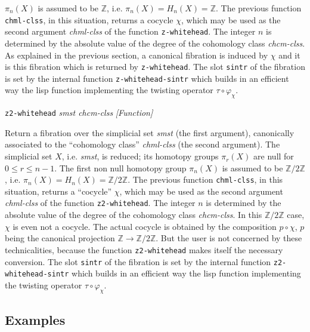 {{$\pi_n(X)$ is assumed to be $\mathbb{Z}$, i.e. $\pi_n(X)= H_n(X)= \mathbb{Z}$. The previous function {\tt chml-clss}, in
this situation, returns a cocycle $\chi$, which may be used as the second argument {\em chml-clss} of the function
{\tt z-whitehead}. The integer  $n$ is determined by the absolute value of the degree of the
cohomology class {\em chcm-clss}. As explained in the previous section, a canonical fibration
is induced by $\chi$ and it is this fibration which is returned by {\tt z-whitehead}. The slot {\tt sintr} of the
fibration is set by the internal function {\tt z-whitehead-sintr} which builds
in an efficient way the lisp function implementing the twisting operator $\tau \circ \varphi_\chi$.
\par}
{\leftskip=5mm
{\tt z2-whitehead} {\em smst chcm-clss}  \hfill {\em [Function]} \par}
{\leftskip=15mm
Return a fibration  over the simplicial set {\em smst} (the first argument), canonically associated
to the ``cohomology class'' {\em chml-clss} (the second argument). The simplicial set $X$, i.e. {\em smst}, is
reduced; its homotopy groups $\pi_r(X)$ are null for $0 \leq r \leq n-1$. The first non null homotopy group
$\pi_n(X)$ is assumed to be $\mathbb{Z}/2\mathbb{Z}$, i.e. $\pi_n(X)= H_n(X)= \mathbb{Z}/2\mathbb{Z}$. The previous function {\tt chml-clss}, in
this situation, returns a ``cocycle'' $\chi$, which may be used as the second argument {\em chml-clss} of the function
{\tt z2-whitehead}. The integer $n$ is determined by the absolute value of the degree of the
cohomology class {\em chcm-clss}. In this $\mathbb{Z}/2\mathbb{Z}$ case, $\chi$ is even not a cocycle. The actual cocycle is
obtained by the composition $p \circ \chi$, $p$ being the canonical projection
$\mathbb{Z} \longrightarrow \mathbb{Z}/{2 \mathbb{Z}}$. But the user is not concerned by these technicalities, because the function
{\tt z2-whitehead} makes itself the necessary conversion. The slot {\tt sintr} of the
fibration is set by the internal function {\tt z2-whitehead-sintr} which builds
in an efficient way the lisp function implementing the twisting operator $\tau \circ \varphi_\chi$.
\par}
}

\subsection* {Examples}

